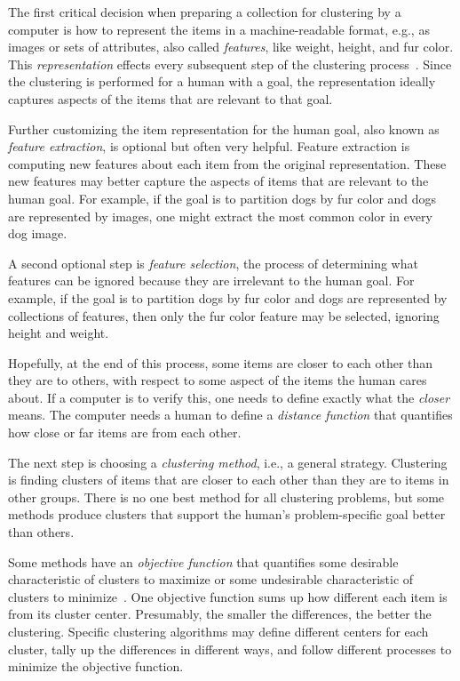 The first critical decision when preparing a collection for clustering by a computer is how to represent the items in a machine-readable format, e.g., as images or sets of attributes, also called {\it features}, like weight, height, and fur color. This {\it representation} effects every subsequent step of the clustering process~\cite{Jain50}. Since the clustering is performed for a human with a goal, the representation ideally captures aspects of the items that are relevant to that goal.

Further customizing the item representation for the human goal, also known as {\it feature extraction}, is optional but often very helpful. Feature extraction is computing new features about each item from the original representation. These new features may better capture the aspects of items that are relevant to the human goal. For example, if the goal is to partition dogs by fur color and dogs are represented by images, one might extract the most common color in every dog image.

A second optional step is {\it feature selection}, the process of determining what features can be ignored because they are irrelevant to the human goal. For example, if the goal is to partition dogs by fur color and dogs are represented by collections of features, then only the fur color feature may be selected, ignoring height and weight.

Hopefully, at the end of this process, some items are closer to each other than they are to others, with respect to some aspect of the items the human cares about. If a computer is to verify this, one needs to define exactly what the {\it closer} means. The computer needs a human to define a {\it distance function} that quantifies how close or far items are from each other.

The next step is choosing a {\it clustering method}, i.e., a general strategy. Clustering is finding clusters of items that are closer to each other than they are to items in other groups. There is no one best method for all clustering problems, but some methods produce clusters that support the human's problem-specific goal better than others.

Some methods have an {\it objective function} that quantifies some desirable characteristic of clusters to maximize or some undesirable characteristic of clusters to minimize~\cite{Jain50}. One objective function sums up how different each item is from its cluster center. Presumably, the smaller the differences, the better the clustering. Specific clustering algorithms may define different centers for each cluster, tally up the differences in different ways, and follow different processes to minimize the objective function.

